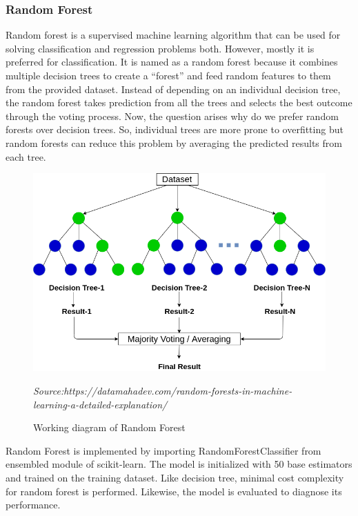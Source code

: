 \subsubsection{Random Forest}
Random forest is a supervised machine learning algorithm that can be used for solving classification and regression problems both. However, mostly it is preferred for classification. It is named as a random forest because it combines multiple decision trees to create a “forest” and feed random features to them from the provided dataset. Instead of depending on an individual decision tree, the random forest takes prediction from all the trees and selects the best outcome through the voting process\cite{awasthi_2020}. 
Now, the question arises why do we prefer random forests over decision trees. So, individual trees are more prone to overfitting but random forests can reduce this problem by averaging the predicted results from each tree.
\begin{figure}[h]
\centering
\includegraphics[scale=0.5]{randomforest.png}
\caption{Working diagram of Random Forest}
\textit{Source:https://datamahadev.com/random-forests-in-machine-learning-a-detailed-explanation/}
\end{figure}

Random Forest  is implemented by importing RandomForestClassifier from ensembled module of scikit-learn. The model is initialized with 50 base estimators and trained on the training dataset. Like decision tree, minimal cost complexity for random forest is performed. Likewise, the model is evaluated to diagnose its performance.
